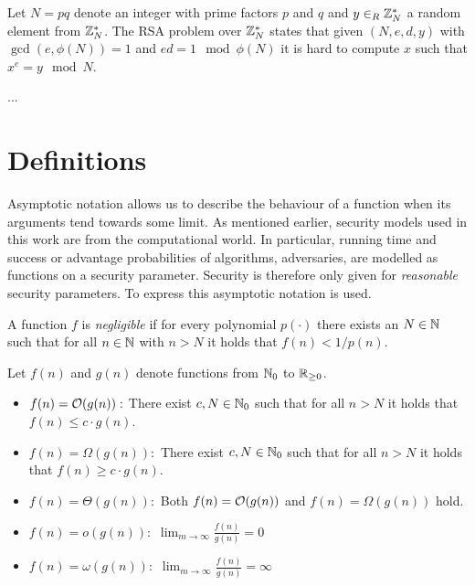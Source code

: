\begin{definition}\label{def:rsa}
Let $N=pq$ denote an integer with prime factors $p$ and $q$ and $y\in_R\mathbb{Z}^\ast_N$ a random element from $\mathbb{Z}^\ast_N$.
The RSA problem over $\mathbb{Z}^\ast_N$ states that given $(N,e,d,y)$ with $\gcd(e, \phi(N))=1$ and $ed=1\mod \phi(N)$ it is hard to compute $x$ such that $x^e = y \mod N$.
\eod
\end{definition}

\begin{definition}\label{def:onemoreRSA}
...
\eod
\end{definition}

\section{Definitions}
Asymptotic notation allows us to describe the behaviour of a function when its arguments tend towards some limit.
As mentioned earlier, security models used in this work are from the computational world.
In particular, running time and success or advantage probabilities of algorithms, \ie adversaries, are modelled as functions on a security parameter.
Security is therefore only given for \emph{reasonable} security parameters.
To express this asymptotic notation is used.

\begin{definition}\label{def:negligible}
A function $f$ is \emph{negligible} if for every polynomial $p(\cdot)$ there exists an $N\in\mathbb{N}$ such that for all $n\in\mathbb{N}$ with $n>N$ it holds that $f(n)<1/p(n)$.
\eod
\end{definition}

\begin{definition}\label{def:asymptotic}
Let $f(n)$ and $g(n)$ denote functions from $\mathbb{N}_0$ to $\mathbb{R}_{\geq 0}$.
\begin{itemize}
	\item $f(n)=\mathcal{O}(g(n)):$ There exist $c,N\in\mathbb{N}_0$ such that for all $n>N$ it holds that $f(n)\leq c\cdot g(n)$.
	\item $f(n)=\Omega(g(n)):$ There exist $c,N\in\mathbb{N}_0$ such that for all $n>N$ it holds that $f(n)\geq c\cdot g(n)$.
	\item $f(n)=\Theta(g(n)):$ Both $f(n)=\mathcal{O}(g(n))$ and $f(n)=\Omega(g(n))$ hold.
	\item $f(n)=o(g(n)):$ $\lim_{m\rightarrow\infty}\frac{f(n)}{g(n)}=0$
	\item $f(n)=\omega(g(n)):$ $\lim_{m\rightarrow\infty}\frac{f(n)}{g(n)}=\infty$ 
	\eod
\end{itemize}
\end{definition}

